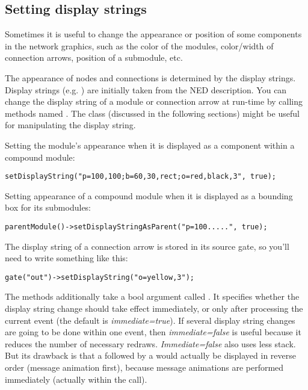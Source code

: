 \subsection{Setting display strings}

Sometimes it is useful to change the appearance or position of
some components in the network graphics, such as the color of the
modules, color/width of connection arrows,
position of a submodule, etc.

The appearance of nodes and connections is determined by the display
strings. Display strings (e.g. )
are initially taken from the NED description.
You can change the display string of a module or connection arrow
at run-time by calling methods named .
The  class (discussed in the following sections)
might be useful for manipulating the display string.

Setting the module's appearance when it is displayed as a component
within a compound module:

\begin{verbatim}
setDisplayString("p=100,100;b=60,30,rect;o=red,black,3", true);
\end{verbatim}

Setting appearance of a compound module when it is displayed as a
bounding box for its submodules:

\begin{verbatim}
parentModule()->setDisplayStringAsParent("p=100.....", true);
\end{verbatim}

The display string of a connection arrow
is stored in its source gate, so you'll need to write something
like this:

\begin{verbatim}
gate("out")->setDisplayString("o=yellow,3");
\end{verbatim}

The  methods additionally take a bool
argument called . It specifies whether the display
string change should take effect immediately, or only after processing
the current event (the default is \textit{immediate=true}). If several
display string changes are going to be done within one event, then
\textit{immediate=false} is useful because it reduces the number of
necessary redraws. \textit{Immediate=false} also uses less stack.  But
its drawback is that a  followed by a
 would actually be displayed in reverse order (message
animation first), because message animations are performed immediately
(actually within the  call).


